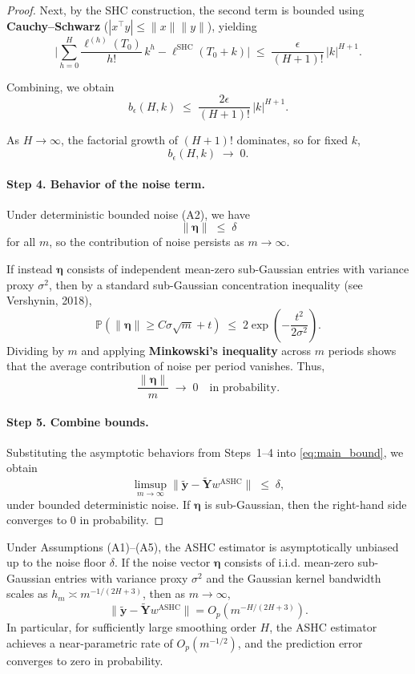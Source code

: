 \documentclass{article}
\begin{document}
\begin{proof}
Next, by the SHC construction, the second term is bounded using 
\textbf{Cauchy--Schwarz} ($|x^\top y| \leq \|x\|\|y\|$), yielding
\[
\Big|\sum_{h=0}^H \frac{\ell^{(h)}(T_0)}{h!}\,k^h - \ell^{\text{SHC}}(T_0+k)\Big|
\;\leq\; \frac{\epsilon}{(H+1)!}\,|k|^{H+1}.
\]

Combining, we obtain
\[
b_\epsilon(H,k) \;\leq\; \frac{2\epsilon}{(H+1)!}\,|k|^{H+1}.
\]

As $H \to \infty$, the factorial growth of $(H+1)!$ dominates, so for fixed $k$,
\[
b_\epsilon(H,k) \;\longrightarrow\; 0.
\]

\paragraph{Step 4. Behavior of the noise term.}
Under deterministic bounded noise (A2), we have
\[
\|\bm{\eta}\| \;\leq\; \delta
\]
for all $m$, so the contribution of noise persists as $m \to \infty$.

If instead $\bm{\eta}$ consists of independent mean-zero sub-Gaussian entries
with variance proxy $\sigma^2$, then by a standard sub-Gaussian concentration inequality
(see Vershynin, 2018),
\[
\mathbb{P}\!\left(\|\bm{\eta}\| \geq C\sigma\sqrt{m} + t\right)
\;\leq\; 2\exp\!\left(-\frac{t^2}{2\sigma^2}\right).
\]
Dividing by $m$ and applying \textbf{Minkowski’s inequality} across $m$ periods shows that the average contribution of noise per period vanishes. Thus,
\[
\frac{\|\bm{\eta}\|}{m} \;\longrightarrow\; 0 \quad \text{in probability}.
\]

\paragraph{Step 5. Combine bounds.}
Substituting the asymptotic behaviors from Steps~1--4 into \eqref{eq:main_bound}, we obtain
\[
\limsup_{m \to \infty}
\|\widetilde{\mathbf{y}} - \widetilde{\mathbf{Y}} w^{\text{ASHC}}\|
\;\leq\; \delta,
\]
under bounded deterministic noise.
If $\bm{\eta}$ is sub-Gaussian, then the right-hand side converges to $0$ in probability.
\end{proof}

\begin{corollary}
\label{cor:ashc_consistency}
Under Assumptions (A1)--(A5), the ASHC estimator is asymptotically unbiased up to the noise floor $\delta$. If the noise vector $\bm{\eta}$ consists of i.i.d. mean-zero sub-Gaussian entries with variance proxy $\sigma^2$ and the Gaussian kernel bandwidth scales as $h_m \asymp m^{-1/(2H+3)}$, then as $m \to \infty$,
\[
\|\widetilde{\mathbf{y}} - \widetilde{\mathbf{Y}} w^{\text{ASHC}}\| = O_p\!\left(m^{-H/(2H+3)}\right).
\]
In particular, for sufficiently large smoothing order $H$, the ASHC estimator achieves a near-parametric rate of $O_p(m^{-1/2})$, and the prediction error converges to zero in probability.
\end{corollary}
\end{document}
